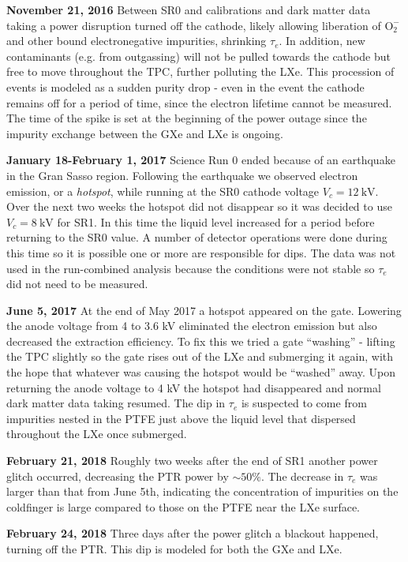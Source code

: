 \textbf{November 21, 2016}  Between SR0 \ambe and \metakr calibrations and dark matter data taking a power disruption
turned off the cathode, likely allowing liberation of $\mathrm{O_2^-}$ and other bound electronegative impurities, shrinking
$\tau_e$.  In addition, new contaminants (e.g. from outgassing) will not be pulled towards the cathode but free to move throughout the TPC,
further polluting the LXe.  This procession of events is modeled as a sudden purity drop - even in the event the cathode remains off for a
period of time, since the electron lifetime cannot be measured.  The time of the spike is set at the beginning of the power outage since
the impurity exchange between the GXe and LXe is ongoing.

\textbf{January 18-February 1, 2017} Science Run 0 ended because of an earthquake in the Gran Sasso region.  Following the earthquake we
observed
electron emission, or a \textit{hotspot}, while running at the SR0 cathode voltage $V_c = 12\ \mathrm{kV}$.  Over the next two
weeks the hotspot did not disappear so it was decided to use $V_c = 8\ \mathrm{kV}$ for SR1.  In this time the liquid level
increased for a period before returning to the SR0 value.  A number of detector operations were done during
this time so it is possible one or more are responsible for dips.  The data was not used in the
run-combined analysis because the conditions were not stable so $\tau_e$ did not need to be measured.

\textbf{June 5, 2017}  At the end of May 2017 a hotspot appeared on the gate.  Lowering the anode voltage from 4 to 3.6 kV eliminated the
electron emission but also decreased the extraction efficiency.  To fix this we tried a gate ``washing'' - lifting the TPC
slightly so the gate rises out of the LXe and submerging it again, with the hope that whatever was causing the hotspot would be ``washed''
away.  Upon returning the anode voltage to 4 kV the hotspot had disappeared and normal dark matter data taking resumed.  The dip in
$\tau_e$ is suspected to come from impurities nested in the PTFE just above the liquid level that dispersed throughout the LXe once
submerged.

\textbf{February 21, 2018}  Roughly two weeks after the end of SR1 another power glitch occurred, decreasing the PTR power by
${\sim} 50\%$.  The decrease in $\tau_e$ was larger than that from June 5th, indicating the concentration of impurities on the
coldfinger is large compared to those on the PTFE near the LXe surface.

\textbf{February 24, 2018}  Three days after the power glitch a blackout happened, turning off the PTR.  This dip is modeled
for both the GXe and LXe.

